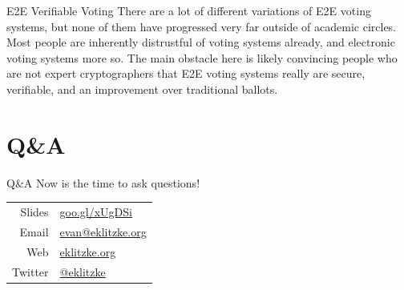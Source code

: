 \documentclass[14pt]{beamer}
\begin{document}
\begin{frame}{E2E Verifiable Voting}
  There are a lot of different variations of E2E voting systems, but none of
  them have progressed very far outside of academic circles.
  \newline
  \newline
  Most people are inherently distrustful of voting systems already, and
  electronic voting systems more so.
  \newline
  \newline
  The main obstacle here is likely convincing people who are not expert
  cryptographers that E2E voting systems really are secure, verifiable, and an
  improvement over traditional ballots.
\end{frame}

\section{Q{\&}A}

\begin{frame}{Q{\&}A}
  Now is the time to ask questions!
  \vspace{10mm}
  \newline
  \begin{tabular}{r | l}
    Slides & \href{https://goo.gl/xUgDSi}{goo.gl/xUgDSi} \\
    Email & \href{mailto:evan@eklitzke.org}{evan@eklitzke.org} \\
    Web & \href{https://eklitzke.org}{eklitzke.org} \\
    Twitter & \href{https://twitter.com/eklitzke}{@eklitzke} \\
  \end{tabular}
\end{frame}
\end{document}

